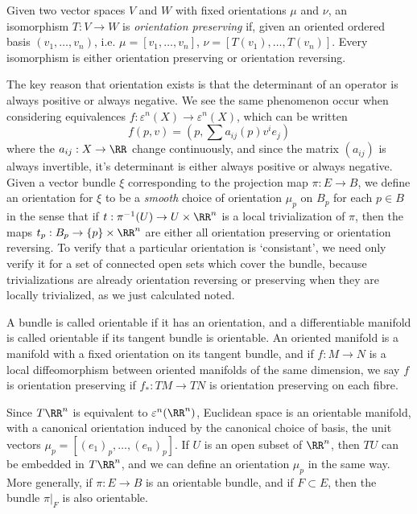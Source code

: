 Given two vector spaces $V$ and $W$ with fixed orientations $\mu$ and $\nu$, an isomorphism $T: V \to W$ is \emph{orientation preserving} if, given an oriented ordered basis $(v_1, \dots, v_n)$, i.e. $\mu = [v_1, \dots, v_n]$, $\nu = [T(v_1), \dots, T(v_n)]$. Every isomorphism is either orientation preserving or orientation reversing.

The key reason that orientation exists is that the determinant of an operator is always positive or always negative. We see the same phenomenon occur when considering equivalences $f: \varepsilon^n(X) \to \varepsilon^n(X)$, which can be written
%
\[ f(p,v) = \left(p, \sum a_{ij}(p) v^i e_j \right) \]
%
where the $a_{ij}: X \to \RR$ change continuously, and since the matrix $(a_{ij})$ is always invertible, it's determinant is either always positive or always negative. Given a vector bundle $\xi$ corresponding to the projection map $\pi: E \to B$, we define an orientation for $\xi$ to be a \emph{smooth} choice of orientation $\mu_p$ on $B_p$ for each $p \in B$ in the sense that if $t: \pi^{-1}(U) \to U \times \RR^n$ is a local trivialization of $\pi$, then the maps $t_p: B_p \to \{ p \} \times \RR^n$ are either all orientation preserving or orientation reversing. To verify that a particular orientation is `consistant', we need only verify it for a set of connected open sets which cover the bundle, because trivializations are already orientation reversing or preserving when they are locally trivialized, as we just calculated noted.

A bundle is called orientable if it has an orientation, and a differentiable manifold is called orientable if its tangent bundle is orientable. An oriented manifold is a manifold with a fixed orientation on its tangent bundle, and if $f: M \to N$ is a local diffeomorphism between oriented manifolds of the same dimension, we say $f$ is orientation preserving if $f_*: TM \to TN$ is orientation preserving on each fibre.

\begin{example}
Since $T\RR^n$ is equivalent to $\varepsilon^n(\RR^n)$, Euclidean space is an orientable manifold, with a canonical orientation induced by the canonical choice of basis, the unit vectors $\mu_p = [(e_1)_p, \dots, (e_n)_p]$. If $U$ is an open subset of $\RR^n$, then $TU$ can be embedded in $T\RR^n$, and we can define an orientation $\mu_p$ in the same way. More generally, if $\pi: E \to B$ is an orientable bundle, and if $F \subset E$, then the bundle $\pi|_F$ is also orientable.
\end{example}

